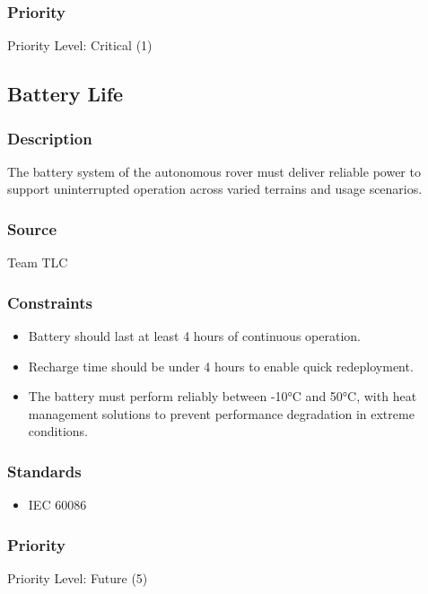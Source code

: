 \subsubsection{Priority}
Priority Level: Critical (1)

\subsection{Battery Life}
\subsubsection{Description}
The battery system of the autonomous rover must deliver reliable power to support uninterrupted operation across varied terrains and usage scenarios.
\subsubsection{Source}
Team TLC
\subsubsection{Constraints}
\begin{itemize}
  \item Battery should last at least 4 hours of continuous operation.
  \item Recharge time should be under 4 hours to enable quick redeployment.
  \item The battery must perform reliably between -10°C and 50°C, with heat management solutions to prevent performance degradation in extreme conditions.
\end{itemize}
\subsubsection{Standards}
\begin{itemize}
    \item IEC 60086 \cite{IECBATT}
\end{itemize}
\subsubsection{Priority}
Priority Level: Future (5)
